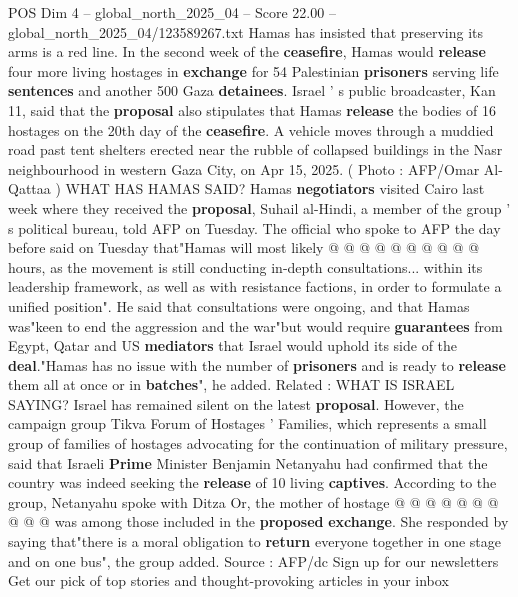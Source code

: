 \begin{textsample}{POS Dim 4 – global\_north\_2025\_04 – Score 22.00 – global\_north\_2025\_04/123589267.txt}
Hamas has insisted that preserving its arms is a red line.
In the second week of the \textbf{ceasefire}, Hamas would \textbf{release} four more living hostages in \textbf{exchange} for 54 Palestinian \textbf{prisoners} serving life \textbf{sentences} and another 500 Gaza \textbf{detainees}.
Israel ' s public broadcaster, Kan 11, said that the \textbf{proposal} also stipulates that Hamas \textbf{release} the bodies of 16 hostages on the 20th day of the \textbf{ceasefire}.
A vehicle moves through a muddied road past tent shelters erected near the rubble of collapsed buildings in the Nasr neighbourhood in western Gaza City, on Apr 15, 2025. ( Photo : AFP/Omar Al-Qattaa ) WHAT HAS HAMAS SAID?
Hamas \textbf{negotiators} visited Cairo last week where they received the \textbf{proposal}, Suhail al-Hindi, a member of the group ' s political bureau, told AFP on Tuesday.
The official who spoke to AFP the day before said on Tuesday that"Hamas will most likely @ @ @ @ @ @ @ @ @ @ hours, as the movement is still conducting in-depth consultations... within its leadership framework, as well as with resistance factions, in order to formulate a unified position".
He said that consultations were ongoing, and that Hamas was"keen to end the aggression and the war"but would require \textbf{guarantees} from Egypt, Qatar and US \textbf{mediators} that Israel would uphold its side of the \textbf{deal}."Hamas has no issue with the number of \textbf{prisoners} and is ready to \textbf{release} them all at once or in \textbf{batches}", he added.
Related : WHAT IS ISRAEL SAYING?
Israel has remained silent on the latest \textbf{proposal}.
However, the campaign group Tikva Forum of Hostages ' Families, which represents a small group of families of hostages advocating for the continuation of military pressure, said that Israeli \textbf{Prime} Minister Benjamin Netanyahu had confirmed that the country was indeed seeking the \textbf{release} of 10 living \textbf{captives}.
According to the group, Netanyahu spoke with Ditza Or, the mother of hostage @ @ @ @ @ @ @ @ @ @ was among those included in the \textbf{proposed} \textbf{exchange}.
She responded by saying that"there is a moral obligation to \textbf{return} everyone together in one stage and on one bus", the group added.
Source : AFP/dc Sign up for our newsletters Get our pick of top stories and thought-provoking articles in your inbox

\end{textsample}
